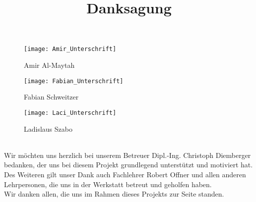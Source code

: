 \documentclass[11pt]{article}
\begin{document}
\begin{figure}[h]
	\begin{center}
		\scalebox{0.5}
		{\texttt{[image: Amir\_Unterschrift]}}
		\caption*{Amir Al-Maytah}
	\end{center}
\end{figure}
\begin{figure}[h]
	\begin{center}
		\scalebox{0.5}
		{\texttt{[image: Fabian\_Unterschrift]}}
		\caption*{Fabian Schweitzer}
	\end{center}
\end{figure}
\begin{figure}[h]
	\begin{center}
		\scalebox{0.5}
		{\texttt{[image: Laci\_Unterschrift]}}
		\caption*{Ladislaus Szabo}
	\end{center}
\end{figure}

\pagebreak


\begin{center}

	\hfill \break
	\hfill \break
	\hfill \break
	\hfill \break
	\hfill \break
	\title{\textbf{\LARGE{Danksagung}}}	
	\maketitle

\end{center}

\hfill \break
\\
Wir möchten uns herzlich bei unserem Betreuer Dipl.-Ing. Christoph Diemberger bedanken, 
der uns bei diesem Projekt grundlegend unterstützt und motiviert hat. 
\hfill \break
\\
Des Weiteren gilt unser Dank auch Fachlehrer Robert Offner und allen anderen Lehrpersonen, 
die uns in der Werkstatt betreut und geholfen haben.
\hfill \break
\\
Wir danken allen, die uns im Rahmen dieses Projekts zur Seite standen.

\pagebreak
\end{document}
